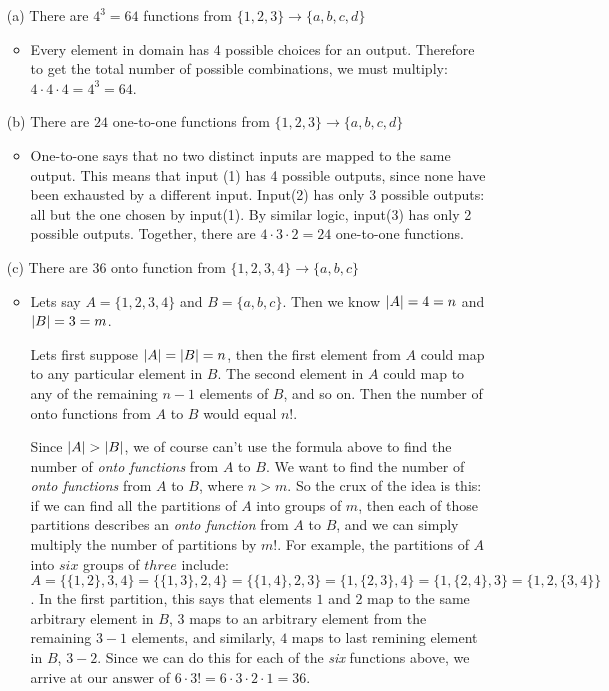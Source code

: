 \documentclass[12pt]{article}
\begin{document}
\begin{enumerate}
\item[(a)] There are $4^3 = 64$ functions from $\{ 1, 2, 3 \} \rightarrow \{ a, b, c, d \}$

\begin{itemize}
    \item Every element in domain has 4 possible choices for an output. Therefore to get the total number of possible combinations, we must multiply: $ 4 \cdot 4 \cdot 4 = 4^3 = 64$.
\end{itemize}

\item[(b)] There are $24$ one-to-one functions from $\{ 1, 2, 3 \} \rightarrow \{ a, b, c, d \}$

\begin{itemize}
    \item One-to-one says that no two distinct inputs are mapped to the same output. This means that input (1) has 4 possible outputs, since none have been exhausted by a different input. Input(2) has only 3 possible outputs: all but the one chosen by input(1). By similar logic, input(3) has only 2 possible outputs. Together, there are $4 \cdot 3 \cdot 2 = 24$ one-to-one functions.
\end{itemize}

\item[(c)] There are $36$ onto function from $\{1, 2, 3, 4\} \rightarrow \{a, b, c\}$

\begin{itemize}
  \item Lets say $A = \{ 1, 2, 3, 4 \}$ and $B = \{ a, b, c \}$. Then we know $\left | A \right | = 4 = n$ and $\left | B \right | = 3 = m$.

  Lets first suppose $\left | A \right | = \left | B \right | = n$, then the first element from $A$ could map to any particular element in $B$. The second element in $A$ could map to any of the remaining $n - 1$ elements of $B$, and so on. Then the number of onto functions from $A$ to $B$ would equal $n!$.

  Since $\left | A \right | > \left | B \right |$, we of course can't use the formula above to find the number of \emph{onto functions} from $A$ to $B$. We want to find the number of \emph{onto functions} from $A$ to $B$, where $n > m$. So the crux of the idea is this: if we can find all the partitions of $A$ into groups of $m$, then each of those partitions describes an \emph{onto function} from $A$ to $B$, and we can simply multiply the number of partitions by $m!$. For example, the partitions of $A$ into $six$ groups of $three$ include:
  $A = \{ \{ 1, 2 \}, 3, 4 \} = \{ \{ 1, 3 \}, 2, 4 \} = \{ \{ 1, 4 \}, 2, 3 \} = \{ 1, \{ 2, 3 \}, 4 \} = \{ 1, \{ 2, 4 \}, 3 \} = \{ 1, 2, \{ 3, 4 \} \}$. In the first partition, this says that elements $1$ and $2$ map to the same arbitrary element in $B$, $3$ maps to an arbitrary element from the remaining $3 - 1$ elements, and similarly, $4$ maps to last remining element in $B$, $3 - 2$. Since we can do this for each of the \emph{six} functions above, we arrive at our answer of $6 \cdot 3! = 6 \cdot 3 \cdot 2 \cdot 1 = 36$.
\end{itemize}


\end{enumerate}
\end{document}

